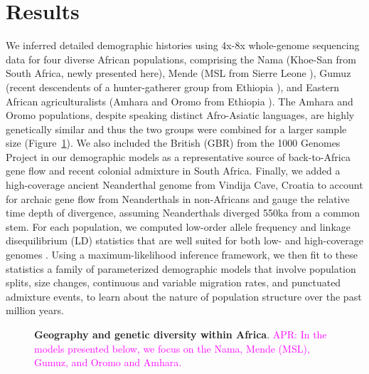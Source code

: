 \documentclass[]{article}
\newcommand{\aprcomment}[1]{{\textcolor{magenta}{APR: #1}}}
\begin{document}
\section*{Results}

We inferred detailed demographic histories using 4x-8x whole-genome sequencing
data for four diverse African populations, comprising the Nama (Khoe-San from
South Africa, newly presented here), Mende (MSL from Sierre Leone
\citep{1000_Genomes_Project_Consortium2015-zq}), Gumuz (recent descendents of a
hunter-gatherer group from Ethiopia \citep{Gurdasani2015-qy,Gopalan2019-wd}),
and Eastern African agriculturalists (Amhara and Oromo from Ethiopia
\citep{Gurdasani2015-qy}). The Amhara and Oromo populations, despite speaking
distinct Afro-Asiatic languages, are highly genetically similar
\citep{Pagani2015-pz,Gopalan2019-wd} and thus the two groups were combined for
a larger sample size (Figure~\ref{fig:1}). We also included the British
(GBR) from the 1000 Genomes Project in our demographic models as a
representative source of back-to-Africa gene flow and recent colonial admixture
in South Africa. Finally, we added a high-coverage ancient Neanderthal genome
from Vindija Cave, Croatia \citep{Prufer2017-kk} to account for archaic gene
flow from Neanderthals in non-Africans and gauge the relative time depth of
divergence, assuming Neanderthals diverged 550ka from a common stem. For each
population, we computed low-order allele frequency and linkage disequilibrium
(LD) statistics that are well suited for both low- and high-coverage genomes
\citep{Ragsdale2019-nt,Ragsdale2020-nz}. Using a maximum-likelihood inference
framework, we then fit to these statistics a family of parameterized
demographic models that involve population splits, size changes, continuous and
variable migration rates, and punctuated admixture events, to learn about the
nature of population structure over the past million years.

\begin{figure}[ht]
\begin{center}
\caption{\textbf{Geography and genetic diversity within Africa}.
    \aprcomment{In the models presented below, we focus on the Nama, 
    Mende (MSL), Gumuz, and Oromo and Amhara.}
}
\label{fig:1}
\end{center}
\end{figure}
\end{document}
